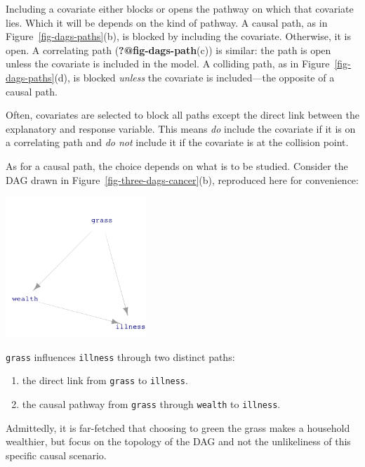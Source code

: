\documentclass[
  letterpaper,
  DIV=11,
  numbers=noendperiod,
  oneside]{scrreprt}
\providecommand{\tightlist}{%
  \setlength{\itemsep}{0pt}\setlength{\parskip}{0pt}}\usepackage{longtable,booktabs,array}
\begin{document}
Including a covariate either blocks or opens the pathway on which that
covariate lies. Which it will be depends on the kind of pathway. A
causal path, as in Figure~\ref{fig-dags-paths}(b), is blocked by
including the covariate. Otherwise, it is open. A correlating path
(\textbf{?@fig-dags-path}(c)) is similar: the path is open unless the
covariate is included in the model. A colliding path, as in
Figure~\ref{fig-dags-paths}(d), is blocked \emph{unless} the covariate
is included---the opposite of a causal path.

Often, covariates are selected to block all paths except the direct link
between the explanatory and response variable. This means \emph{do}
include the covariate if it is on a correlating path and \emph{do not}
include it if the covariate is at the collision point.

As for a causal path, the choice depends on what is to be studied.
Consider the DAG drawn in Figure~\ref{fig-three-dags-cancer}(b),
reproduced here for convenience:

\begin{marginfigure}

{\centering \includegraphics[width=2.08in,height=\textheight]{./www/grass-dag-2.png}

}

\end{marginfigure}

\texttt{grass} influences \texttt{illness} through two distinct paths:

\begin{enumerate}
\def\labelenumi{\roman{enumi}.}
\tightlist
\item
  the direct link from \texttt{grass} to \texttt{illness}.
\item
  the causal pathway from \texttt{grass} through \texttt{wealth} to
  \texttt{illness}.
\end{enumerate}

Admittedly, it is far-fetched that choosing to green the grass makes a
household wealthier, but focus on the topology of the DAG and not the
unlikeliness of this specific causal scenario.
\end{document}
